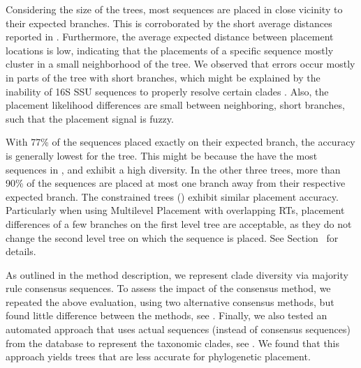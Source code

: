 Considering the size of the trees, most sequences are placed in close vicinity to their expected branches.
This is corroborated by the short average distances reported in .
Furthermore, the average expected distance between placement locations \citep[EDPL,][]{Matsen2010} is low,
indicating that the placements of a specific sequence mostly cluster in a small neighborhood of the tree.
We observed that errors occur mostly in parts of the tree with short branches,
which might be explained by the inability of 16S SSU sequences to properly resolve certain clades \citep{Janda2007}.
Also, the placement likelihood differences are small between neighboring, short branches,
such that the placement signal is fuzzy.

With 77\% of the sequences placed exactly on their expected branch,
the accuracy is generally lowest for the  tree.
This might be because the  have the most sequences in , and exhibit a high diversity.
In the other three trees, more than 90\% of the sequences are placed
at most one branch away from their respective expected branch.
The constrained trees () exhibit similar placement accuracy.
Particularly when using Multilevel Placement with overlapping \acp{RT},
placement differences of a few branches on the first level tree are acceptable,
as they do not change the second level tree on which the sequence is placed.
See Section~ for details.

As outlined in the method description, we represent clade diversity via majority rule consensus sequences.
To assess the impact of the consensus method, we repeated the above evaluation, using two alternative consensus methods,
but found little difference between the methods, see .
Finally, we also tested an automated approach
that uses actual sequences (instead of consensus sequences) from the database
to represent the taxonomic clades, see .
We found that this approach yields trees that are less accurate for phylogenetic placement.

